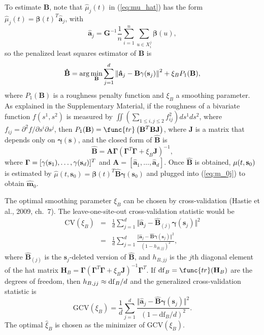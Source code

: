 \documentclass[titlepage,12pt]{article}
\begin{document}
To estimate $\mathbf{B}$, note that $\hat{\mu}_{j}(t)$ in (\ref{eq:mu_hat})
has the form $\hat{\mu}_{j}(t)=\mathbf{\beta }(t)^{T}\mathbf{\hat{a}}_{j}$,
with 
\begin{equation*}
\mathbf{\hat{a}}_{j}=\mathbf{G}^{-1}\frac{1}{n}\sum_{i=1}^{n}\sum_{u\in
X_{i}^{j}}\mathbf{\beta }(u),
\end{equation*}%
so the penalized least squares estimator of $\mathbf{B}$ is 
\begin{equation*}
\mathbf{\hat{B}}=\arg \min_{\mathbf{B}}\sum_{j=1}^{d}\left\Vert \mathbf{\hat{%
a}}_{j}-\mathbf{B\gamma }(\mathbf{s}_{j})\right\Vert ^{2}+\xi _{B}P_{1}(%
\mathbf{B}),
\end{equation*}%
where $P_{1}(\mathbf{B})$ is a roughness penalty function and $\xi _{B}$ a
smoothing parameter. As explained in the Supplementary Material, if the
roughness of a bivariate function $f(s^{1},s^{2})$ is measured by $\iint
(\sum_{1\leq i,j\leq 2}f_{ij}^{2})ds^{1}ds^{2}$, where $f_{ij}=\partial
^{2}f/\partial s^{i}\partial s^{j}$, then $P_{1}(\mathbf{B})=\func{tr}\left( 
\mathbf{B}^{T}\mathbf{BJ}\right) $, where $\mathbf{J}$ is a matrix that
depends only on $\mathbf{\gamma }(\mathbf{s})$, and the closed form of $%
\mathbf{\hat{B}}$ is 
\begin{equation}
\mathbf{\hat{B}}=\mathbf{A\Gamma }(\mathbf{\Gamma }^{T}\mathbf{\Gamma }+\xi
_{B}\mathbf{J})^{-1},  \label{eq:B_hat}
\end{equation}%
where $\mathbf{\Gamma }=[\mathbf{\gamma }(\mathbf{s}_{1}),\ldots ,\mathbf{%
\gamma }(\mathbf{s}_{d})]^{T}$ and $\mathbf{A}=[\mathbf{\hat{a}}_{1},\ldots ,%
\mathbf{\hat{a}}_{d}]$. Once $\mathbf{\hat{B}}$ is obtained, $\mu (t,\mathbf{%
s}_{0})$ is estimated by $\hat{\mu}(t,\mathbf{s}_{0})=\mathbf{\beta }(t)^{T}%
\mathbf{\hat{B}\gamma }(\mathbf{s}_{0})$ and plugged into (\ref{eq:m_0j}) to
obtain $\mathbf{\hat{m}}_{0}$.

The optimal smoothing parameter $\xi _{B}$ can be chosen by cross-validation
(Hastie et al., 2009, ch.~7). The leave-one-site-out cross-validation
statistic would be 
\begin{eqnarray*}
\mathrm{CV}(\xi _{B}) &=&\frac{1}{d}\sum_{j=1}^{d}\Vert \mathbf{\hat{a}}_{j}-%
\mathbf{\hat{B}}_{(j)}\mathbf{\gamma }(\mathbf{s}_{j})\Vert ^{2} \\
&=&\frac{1}{d}\sum_{j=1}^{d}\frac{\Vert \mathbf{\hat{a}}_{j}-\mathbf{\hat{B}%
\gamma }(\mathbf{s}_{j})\Vert ^{2}}{(1-h_{B,jj})^{2}},
\end{eqnarray*}%
where $\mathbf{\hat{B}}_{(j)}$ is the $\mathbf{s}_{j}$-deleted version of $%
\mathbf{\hat{B}}$, and $h_{B,jj}$ is the $j$th diagonal element of the hat
matrix $\mathbf{H}_{B}=\mathbf{\Gamma }(\mathbf{\Gamma }^{T}\mathbf{\Gamma }%
+\xi _{B}\mathbf{J})^{-1}\mathbf{\Gamma }^{T}$. If $\mathrm{df}_{B}=\func{tr}%
(\mathbf{H}_{B})$ are the degrees of freedom, then $h_{B,jj}\approx \mathrm{%
df}_{B}/d$ and the generalized cross-validation statistic is 
\begin{equation*}
\mathrm{GCV}(\xi _{B})=\frac{1}{d}\sum_{j=1}^{d}\frac{\Vert \mathbf{\hat{a}}%
_{j}-\mathbf{\hat{B}\gamma }(\mathbf{s}_{j})\Vert ^{2}}{(1-\mathrm{df}%
_{B}/d)^{2}}.
\end{equation*}%
The optimal $\hat{\xi}_{B}$ is chosen as the minimizer of $\mathrm{GCV}(\xi
_{B})$.
\end{document}

